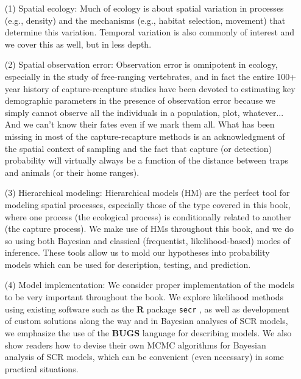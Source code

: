 \begin{itemize}
\item[(1)]  Spatial ecology: Much of ecology is about spatial variation in
processes (e.g., density) and the mechanisms (e.g., habitat selection, movement) that
determine this variation. Temporal variation is also commonly of interest and
we cover this as well, but in less depth.

\item[(2)] Spatial observation error: Observation error is omnipotent in
ecology, especially in the study of free-ranging vertebrates, and in
fact the entire 100+ year history of capture-recapture studies have
been devoted to estimating key demographic parameters in the
presence of observation error because we simply cannot observe all
the individuals in a population, plot, whatever... And we can't know
their fates even if we mark them all. What has been missing in most
of the capture-recapture methods is an acknowledgment of the
spatial context of sampling and the fact that capture (or detection)
probability will virtually always be a function of the distance
between traps and animals (or their home ranges).

\item[(3)] Hierarchical modeling: Hierarchical models (HM) are the
  perfect tool for modeling spatial processes, especially those of the
  type covered in this book, where one process (the ecological
  process) is conditionally related to another (the capture
  process). We make use of HMs throughout this book, and we do so
  using both Bayesian and classical (frequentist, likelihood-based)
  modes of inference. These tools allow us to mold our hypotheses into
  probability models which can be used for description, testing, and
  prediction.

\item[(4)] Model implementation: We consider proper implementation of
  the models to be very important throughout the book.  We explore
  likelihood methods using existing software such as the {\bf R}
  package \mbox{\tt secr} \citep{efford:2011}, as well as development
  of custom solutions along the way and in Bayesian analyses of SCR
  models, we emphasize the use of the {\bf BUGS} language for
  describing models.  We also show readers how to devise their own
  MCMC algorithms for Bayesian analysis of SCR models, which can be
  convenient (even necessary) in some practical situations.

\end{itemize}

